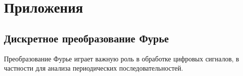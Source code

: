 \chapter{Приложения}
\section{Дискретное преобразование Фурье}
\label{AddFourier}

Преобразование Фурье играет важную
роль в обработке цифровых сигналов, в частности для анализа
периодических последовательностей.







